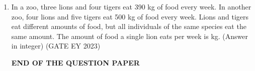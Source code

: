 \documentclass[journal,12pt,onecolumn]{IEEEtran}
\theoremstyle{remark}
\begin{document}
\begin{enumerate}


 \item In a zoo, three lions and four tigers eat 390 kg of food every week. In another zoo,
four lions and five tigers eat 500 kg of food every week. Lions and tigers eat
different amounts of food, but all individuals of the same species eat the same
amount. The amount of food a single lion eats per week is \underline{\hspace{1.5cm}} kg.
(Answer in integer)
\hfill{(GATE EY 2023)}


\begin{center}
    \textbf{END OF THE QUESTION PAPER}
\end{center}








    
\end{enumerate}
\end{document}
